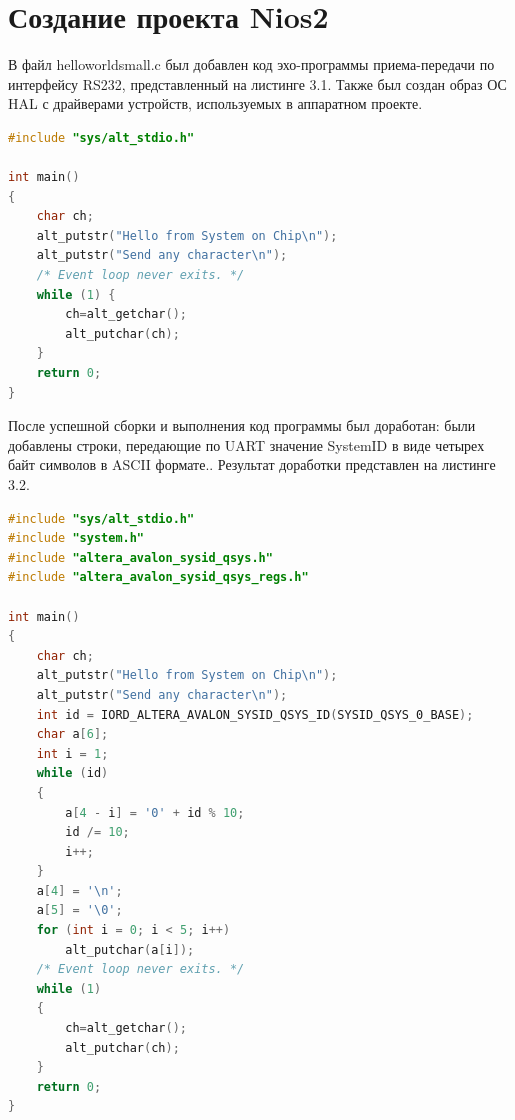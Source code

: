 \documentclass[12pt]{report}
\begin{document}
\section{Создание проекта Nios2}
В файл helloworldsmall.c был добавлен код эхо-программы приема-передачи по интерфейсу RS232, представленный на листинге 3.1. Также был создан образ ОС HAL с драйверами устройств, используемых в аппаратном проекте. \begin{lstlisting}[label=some-code,caption=Функция нахождения расстояния Левенштейна рекурсивно,language=C++]
#include "sys/alt_stdio.h"

int main()
{
    char ch;
    alt_putstr("Hello from System on Chip\n");
    alt_putstr("Send any character\n");
    /* Event loop never exits. */
    while (1) { 
        ch=alt_getchar();
        alt_putchar(ch);
    }
    return 0; 
}
\end{lstlisting}
После успешной сборки и выполнения код программы был доработан: были добавлены строки, передающие по UART значение SystemID в виде четырех байт символов в ASCII формате.. Результат доработки представлен на листинге 3.2.
\begin{lstlisting}[label=some-code,caption=Функция нахождения расстояния Левенштейна рекурсивно,language=C++]
#include "sys/alt_stdio.h"
#include "system.h"
#include "altera_avalon_sysid_qsys.h"
#include "altera_avalon_sysid_qsys_regs.h"

int main()
{
    char ch;
    alt_putstr("Hello from System on Chip\n");
    alt_putstr("Send any character\n");
    int id = IORD_ALTERA_AVALON_SYSID_QSYS_ID(SYSID_QSYS_0_BASE);
    char a[6];
    int i = 1;
    while (id)
    {
        a[4 - i] = '0' + id % 10;
        id /= 10;
        i++;
    }
    a[4] = '\n';
    a[5] = '\0';
    for (int i = 0; i < 5; i++)
        alt_putchar(a[i]);
    /* Event loop never exits. */
    while (1) 
    {
        ch=alt_getchar();
        alt_putchar(ch);
    }
    return 0;
}
\end{lstlisting}
\end{document}
